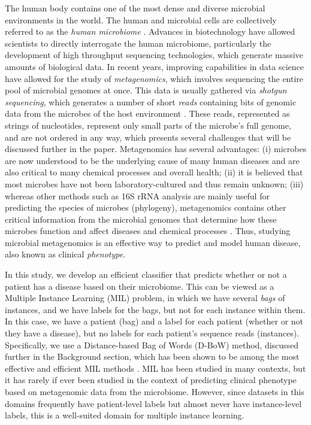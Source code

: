 
The human body contains one of the most dense and diverse microbial environments in the world. The human and microbial cells are collectively referred to as the \emph{human microbiome} \cite{turnbaugh_human_2007,backhed_host-bacterial_2005}. Advances in biotechnology have allowed scientists to directly interrogate the human microbiome, particularly the development of high throughput sequencing technologies, which generate massive amounts of biological data. In recent years, improving capabilities in data science have allowed for the study of \emph{metagenomics}, which involves sequencing the entire pool of microbial genomes at once. This data is usually gathered via \emph{shotgun sequencing}, which generates a number of short \emph{reads} containing bits of genomic data from the microbes of the host environment \cite{messing81}. These reads, represented as strings of nucleotides, represent only small parts of the microbe's full genome, and are not ordered in any way, which presents several challenges that will be discussed further in the paper. Metagenomics has several advantages: (i) microbes are now understood to be the underlying cause of many human diseases and are also critical to many chemical processes and overall health; (ii) it is believed that most microbes have not been laboratory-cultured and thus remain unknown; (iii) whereas other methods such as 16S rRNA analysis are mainly useful for predicting the species of microbes (phylogeny), metagenomics contains other critical information from the microbial genomes that determine how these microbes function and affect diseases and chemical processes \cite{handelsman04}. Thus, studying microbial metagenomics is an effective way to predict and model human disease, also known as clinical \emph{phenotype}.

In this study, we develop an efficient classifier that predicts whether or not a patient has a disease based on their microbiome. This can be viewed as a Multiple Instance Learning (MIL) problem, in which we have several \emph{bags} of instances, and we have labels for the bags, but not for each instance within them. In this case, we have a patient (bag) and a label for each patient (whether or not they have a disease), but no labels for each patient's sequence reads (instances). Specifically, we use a Distance-based Bag of Words (D-BoW) method, discussed further in the Background section, which has been shown to be among the most effective and efficient MIL methods \cite{amores13}. MIL has been studied in many contexts, but it has rarely if ever been studied in the context of predicting clinical phenotype based on metagenomic data from the microbiome. However, since datasets in this domains frequently have patient-level labels but almost never have instance-level labels, this is a well-suited domain for multiple instance learning. 

